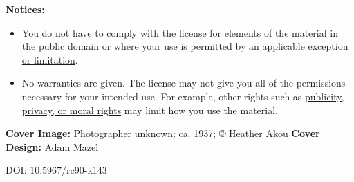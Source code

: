 \begin{flushleft}
\begin{small}
\textbf{Notices:}
\begin{itemize}
\tightlist
\item You do not have to comply with the license for elements of the material in the public domain or where your use is permitted by an applicable \href{https://creativecommons.org/licenses/by-nc-nd/4.0/?ref=chooser-v1#ref-exception-or-limitation}{exception or limitation}.\\
\item No warranties are given. The license may not give you all of the permissions necessary for your intended use. For example, other rights such as \href{https://creativecommons.org/licenses/by-nc-nd/4.0/?ref=chooser-v1#ref-publicity-privacy-or-moral-rights}{publicity, privacy, or moral rights} may limit how you use the material.
\end{itemize}


\textbf{Cover Image:} Photographer unknown; ca. 1937; © Heather Akou  
\textbf{Cover Design:} Adam Mazel

\vspace{2mm}
DOI: 10.5967/rc90-k143
\end{small}
\end{flushleft}
